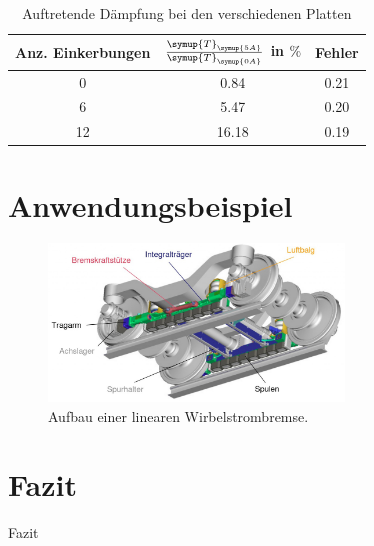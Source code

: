 \begin{frame}

  \begin{table}
    \caption{Auftretende Dämpfung bei den verschiedenen Platten}
     \begin{tabular}{c c c}
        \toprule
        Anz. Einkerbungen & $\frac{\symup{T}_{\symup{5A}}}{\symup{T}_{\symup{0A}}}$ in $\%$ & Fehler \\
        \midrule
        0 & 0.84 & 0.21 \\
        6 & 5.47 & 0.20 \\
        12 & 16.18 & 0.19 \\
        \bottomrule
      \end{tabular}
  \end{table}

\end{frame}

\section{Anwendungsbeispiel}

\begin{frame}
  \begin{figure}
    \centering
    \includegraphics[width=0.7\textwidth]{Wirbelstrombremse_Aufbau.jpg}
    \caption{Aufbau einer linearen Wirbelstrombremse. \cite{Wirbelstrombremse}}
    \label{fig:linWAufbau}
  \end{figure}
\end{frame}

\section{Fazit}

\begin{frame}
  \centering
  \Huge Fazit
\end{frame}


\begin{frame}
  \printbibliography
\end{frame}



